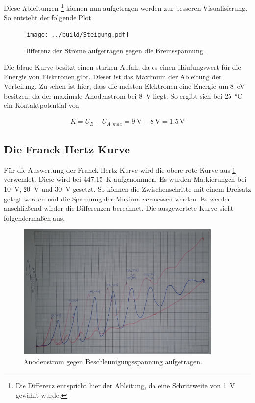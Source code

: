 \noindent Diese Ableitungen \footnote{Die Differenz entspricht hier der Ableitung, da eine Schrittweite von \qty{1}{\volt} gewählt wurde.} 
können nun aufgetragen werden zur besseren Visualisierung. So entsteht der folgende Plot

\begin{figure}[H]
    \centering
    \texttt{[image: ../build/Steigung.pdf]}
    \caption{Differenz der Ströme aufgetragen gegen die Bremsspannung.}
\end{figure}

\noindent Die blaue Kurve besitzt einen starken Abfall, da es einen Häufungswert für die Energie von Elektronen gibt. Dieser 
ist das Maximum der Ableitung der Verteilung.
Zu sehen ist hier, dass die meisten Elektronen eine Energie um \qty{8}{\electronvolt} besitzen, da der maximale Anodenstrom 
bei \qty{8}{\volt} liegt. So ergibt sich 
bei \qty{25}{\celsius} ein Kontaktpotential von 

\begin{align*}
    K=U_B - U_{A; max} = \qty{9}{\volt} - \qty{8}{\volt} = \qty{1.5}{\volt}
\end{align*}


\subsection{Die Franck-Hertz Kurve}
Für die Auswertung der Franck-Hertz Kurve wird die obere rote Kurve aus \ref{fig:Besch} verwendet. Diese wird bei \qty{447.15}{\kelvin} 
aufgenommen. Es wurden Markierungen bei \qty{10}{\volt}, \qty{20}{\volt} und \qty{30}{\volt} gesetzt. So können die Zwischenschritte 
mit einem Dreisatz gelegt werden und die Spannung der Maxima vermessen werden. Es werden anschließend wieder die Differenzen berechnet. 
Die ausgewertete Kurve sieht folgendermaßen aus.

\begin{figure}[H]
    \centering
    \includegraphics[width=0.9\textwidth]{FranckHertz.jpg}
    \caption{Anodenstrom gegen Beschleunigungsspannung aufgetragen.}
    \label{fig:Besch}
\end{figure}

